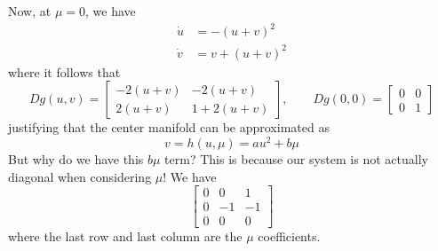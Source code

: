 \documentclass{article}
\begin{document}
Now, at $\mu=0$, we have 
\begin{align*}
    \dot{u}&= -(u+v )^2\\
    \dot{v} &=  v +(u+v )^2
\end{align*} 
where it follows that 
\[
Dg(u,v)=\begin{bmatrix}
    -2(u+v) & -2(u+v)\\2(u+v) & 1 + 2(u+v)
\end{bmatrix},\qquad Dg(0,0)=\begin{bmatrix}
    0 & 0 \\ 0 & 1
\end{bmatrix}
\]
justifying that the center manifold can be approximated as 
\[
v = h(u,\mu) = au^2 + b\mu
\]
But why do we have this $b\mu$ term? This is because our system is not actually diagonal when considering $\mu$! We have 
\[
\begin{bmatrix}
    0 & 0 & 1\\
    0 & -1 & -1 \\
    0 & 0 & 0
\end{bmatrix}
\]
where the last row and last column are the $\mu$ coefficients. 
\end{document}
